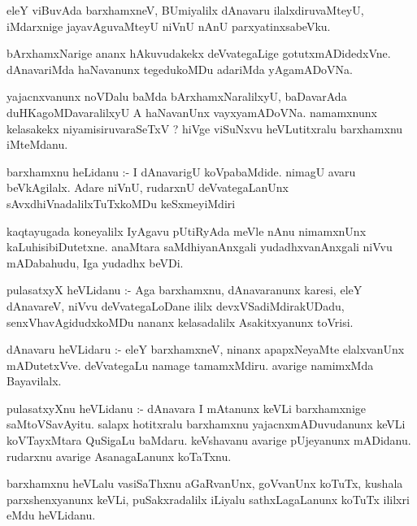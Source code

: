 \documentclass{article}
\begin{document}
\begin{mn}
eleY  viBuvAda  barxhamxneV,  BUmiyalilx  dAnavaru  ilalxdiruvaMteyU,  iMdarxnige  
jayavAguvaMteyU  niVnU  nAnU  parxyatinxsabeVku. 
\end{mn}

\begin{mn}
bArxhamxNarige  ananx hAkuvudakekx  deVvategaLige  gotutxmADidedxVne.  dAnavariMda  
haNavanunx  tegedukoMDu  adariMda  yAgamADoVNa.
\end{mn}

\begin{mn}
yajacnxvanunx  noVDalu  baMda  bArxhamxNaralilxyU,  baDavarAda  duHKagoMDavaralilxyU  
A haNavanUnx  vayxyamADoVNa.  namamxnunx  kelasakekx  niyamisiruvaraSeTxV ?  hiVge  
viSuNxvu  heVLutitxralu  barxhamxnu  iMteMdanu.
\end{mn}

\begin{mn}
barxhamxnu  heLidanu :- I dAnavarigU  koVpabaMdide.  nimagU  avaru  beVkAgilalx.  
Adare  niVnU,  rudarxnU  deVvategaLanUnx  sAvxdhiVnadalilxTuTxkoMDu  keSxmeyiMdiri
\end{mn}

\begin{mn}
kaqtayugada  koneyalilx  IyAgavu  pUtiRyAda  meVle  nAnu  nimamxnUnx  kaLuhisibiDutetxne.  
anaMtara  saMdhiyanAnxgali  yudadhxvanAnxgali  niVvu  mADabahudu,  Iga  yudadhx  beVDi.
\end{mn}

\begin{mn}
pulasatxyX  heVLidanu :- Aga barxhamxnu,  dAnavaranunx  karesi,  eleY  dAnavareV,  
niVvu  deVvategaLoDane  ililx  devxVSadiMdirakUDadu, senxVhavAgidudxkoMDu  nananx  
kelasadalilx  Asakitxyanunx  toVrisi.
\end{mn}

\begin{mn}
dAnavaru  heVLidaru :- eleY  barxhamxneV,  ninanx  apapxNeyaMte  elalxvanUnx  
mADutetxVve.  deVvategaLu  namage  tamamxMdiru.  avarige  namimxMda  Bayavilalx. 
\end{mn}

\begin{mn}
pulasatxyXnu  heVLidanu :- dAnavara  I  mAtanunx keVLi  barxhamxnige  saMtoVSavAyitu.  
salapx  hotitxralu  barxhamxnu  yajacnxmADuvudanunx  keVLi  koVTayxMtara  QuSigaLu  baMdaru.  
keVshavanu  avarige  pUjeyanunx  mADidanu.  rudarxnu  avarige  AsanagaLanunx  koTaTxnu.
\end{mn}

\begin{mn}
barxhamxnu  heVLalu  vasiSaThxnu  aGaRvanUnx,  goVvanUnx  koTuTx,  kushala parxshenxyanunx  
keVLi,  puSakxradalilx  iLiyalu  sathxLagaLanunx  koTuTx  ililxri  eMdu  heVLidanu.
\end{mn}
\end{document}
